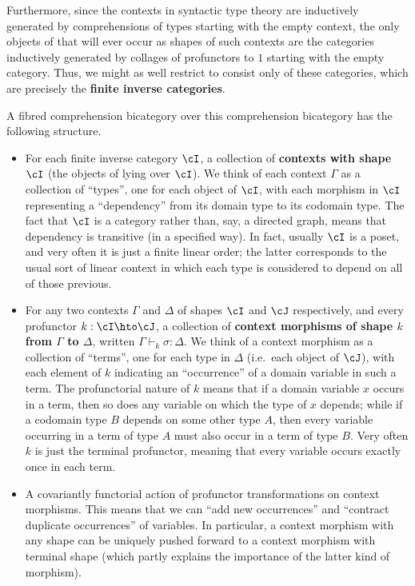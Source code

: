 \documentclass{amsart}
\let\types\vdash
\begin{document}
Furthermore, since the contexts in syntactic type theory are inductively generated by comprehensions of types starting with the empty context, the only objects of \sM that will ever occur as shapes of such contexts are the categories inductively generated by collages of profunctors to $1$ starting with the empty category.
Thus, we might as well restrict \sM to consist only of these categories, which are precisely the \textbf{finite inverse categories}.

A fibred comprehension bicategory over this comprehension bicategory has the following structure.
\begin{itemize}
\item For each finite inverse category $\cI$, a collection of \textbf{contexts with shape $\cI$} (the objects of \sC lying over $\cI$).
  We think of each context $\Gamma$ as a collection of ``types'', one for each object of $\cI$, with each morphism in $\cI$ representing a ``dependency'' from its domain type to its codomain type.
  The fact that $\cI$ is a category rather than, say, a directed graph, means that dependency is transitive (in a specified way).
  In fact, usually $\cI$ is a poset, and very often it is just a finite linear order; the latter corresponds to the usual sort of linear context in which each type is considered to depend on all of those previous.
\item For any two contexts $\Gamma$ and $\Delta$ of shapes $\cI$ and $\cJ$ respectively, and every profunctor $k:\cI\hto \cJ$, a collection of \textbf{context morphisms of shape $k$ from $\Gamma$ to $\Delta$}, written $\Gamma\types_k \sigma: \Delta$.
  We think of a context morphism as a collection of ``terms'', one for each type in $\Delta$ (i.e.\ each object of $\cJ$), with each element of $k$ indicating an ``occurrence'' of a domain variable in such a term.
  The profunctorial nature of $k$ means that if a domain variable $x$ occurs in a term, then so does any variable on which the type of $x$ depends; while if a codomain type $B$ depends on some other type $A$, then every variable occurring in a term of type $A$ must also occur in a term of type $B$.
  Very often $k$ is just the terminal profunctor, meaning that every variable occurs exactly once in each term.
\item A covariantly functorial action of profunctor transformations on context morphisms.
  This means that we can ``add new occurrences'' and ``contract duplicate occurrences'' of variables.
  In particular, a context morphism with any shape can be uniquely pushed forward to a context morphism with terminal shape (which partly explains the importance of the latter kind of morphism).

\end{itemize}
\end{document}
